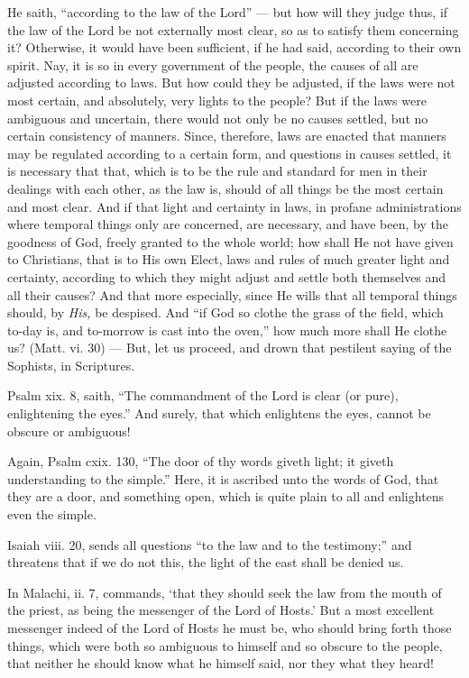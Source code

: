 He saith, “according to the law of the Lord” — but how will they judge thus, if the law of the Lord be not externally most clear, so as to satisfy them concerning it? Otherwise, it would have been sufficient, if he had said, according to their own spirit. Nay, it is so in every government of the people, the causes of all are adjusted according to laws. But how could they be adjusted, if the laws were not most certain, and absolutely, very lights to the people? But if the laws were ambiguous and uncertain, there would not only be no causes settled, but no certain consistency of manners. Since, therefore, laws are enacted that manners may be regulated according to a certain form, and questions in causes settled, it is necessary that that, which is to be the rule and standard for men in their dealings with each other, as the law is, should of all things be the most certain and most clear. And if that light and certainty in laws, in profane administrations where temporal things only are concerned, are necessary, and have been, by the goodness of God, freely granted to the whole world; how shall He not have given to Christians, that is to His own Elect, laws and rules of much greater light and certainty, according to which they might adjust and settle both themselves and all their causes? And that more especially, since He wills that all temporal things should, by \emph{His, }be despised. And “if God so clothe the grass of the field, which to-day is, and to-morrow is cast into the oven,” how much more shall He clothe us? (Matt. vi. 30) — But, let us proceed, and drown that pestilent saying of the Sophists, in Scriptures.

Psalm xix. 8, saith, “The commandment of the Lord is clear (or pure), enlightening the eyes.” And surely, that which enlightens the eyes, cannot be obscure or ambiguous!

Again, Psalm cxix. 130, “The door of thy words giveth light; it giveth understanding to the simple.” Here, it is ascribed unto the words of God, that they are a door, and something open, which is quite plain to all and enlightens even the simple.

Isaiah viii. 20, sends all questions “to the law and to the testimony;” and threatens that if we do not this, the light of the east shall be denied us.

In Malachi, ii. 7, commands, ‘that they should seek the law from the mouth of the priest, as being the messenger of the Lord of Hosts.’ But a most excellent messenger indeed of the Lord of Hosts he must be, who should bring forth those things, which were both so ambiguous to himself and so obscure to the people, that neither he should know what he himself said, nor they what they heard!

